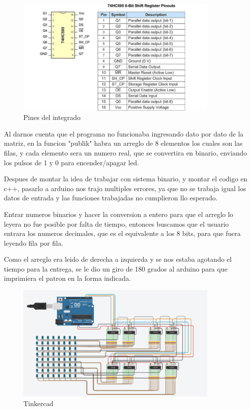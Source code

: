 \documentclass{article}
\begin{document}
 
\begin{figure}[h]
\includegraphics[width=10cm]{Pines integrado2.jpeg}
\centering
\caption{Pines del integrado}
\label{fig:gestion}
\end{figure}

  \vspace{7cm}
  
  Al darnos cuenta que el programa no funcionaba ingresando dato por dato de la matriz, en la funcion "publik" habra un arreglo de 8 elementos los cuales son las filas, y cada elemento sera un numero real, que se convertira en binario, enviando los pulsos de 1 y 0 para encender/apagar led.
  
   \vspace{1cm}
   
   Despues de montar la idea de trabajar con sistema binario, y montar el codigo en c++, pasarlo a arduino nos trajo multiples errores, ya que no se trabaja igual los datos de entrada y las funciones trabajadas no cumplieron llo esperado.
  
  \vspace{1cm}
  
 Entrar numeros binarios y hacer la conversion a entero para que el arreglo lo leyera no fue posible por falta de tiempo, entonces buscamos que el usuario entrara los numeros decimales, que es el equivalente a los 8 bits, para que fuera leyendo fila por fila.
 
   \vspace{1cm}
   
   Como el arreglo era leido de derecha a izquierda y se nos estaba agotando el tiempo para la entrega, se le dio un giro de 180 grados al arduino para que imprimiera el patron en la forma indicada.
 
 
   \vspace{1cm}
 
\begin{figure}[h]
\includegraphics[width=10cm]{Tinkercad.jpeg}
\centering
\caption{Tinkercad}
\label{fig:gestion}
\end{figure}
\end{document}
